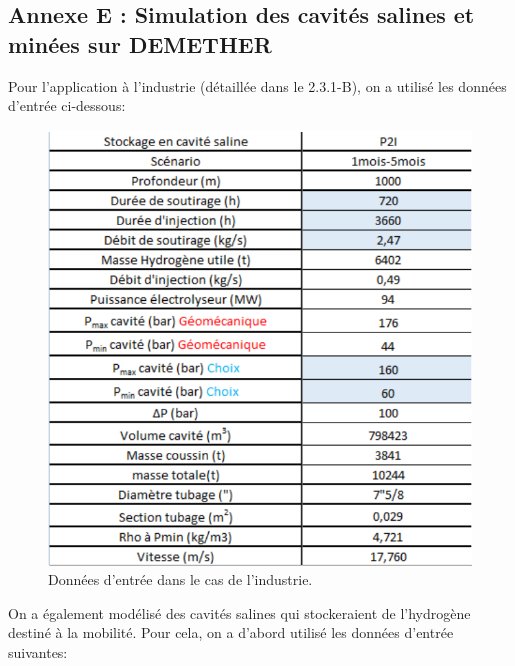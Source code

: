 \documentclass[11pt,french,a4paper]{article}
\begin{document}
\FloatBarrier
\subsection*{Annexe E : Simulation des cavités salines et minées sur DEMETHER} 

Pour l'application à l'industrie (détaillée dans le 2.3.1-B), on a utilisé les données d'entrée ci-dessous:

\begin{figure}[h]
  \centering
  \includegraphics[width=0.8\linewidth]{image/annexe/cav_sal/ind.png}
  \caption{Données d'entrée dans le cas de l'industrie.}
  \end{figure}
\FloatBarrier
On a également modélisé des cavités salines qui stockeraient de l'hydrogène destiné à la mobilité. Pour cela, on a d'abord utilisé les données d'entrée suivantes:
\end{document}
